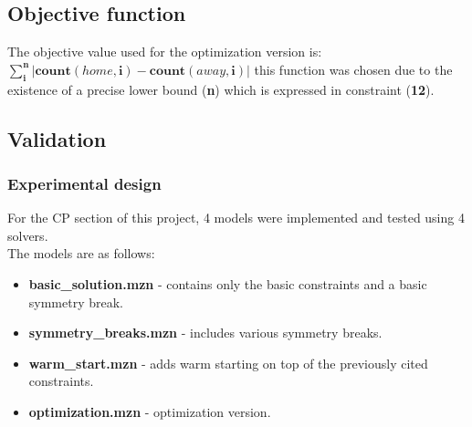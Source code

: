 \documentclass{article}
\begin{document}
\subsection{Objective function}
The objective value used for the optimization version is:\\
$\sum_{\textbf{i}}^{\textbf{n}}|\textbf{count}(home,\textbf{i})-\textbf{count}(away,\textbf{i})|$
this function was chosen due to the existence of a precise lower bound (\textbf{n}) which is expressed in constraint (\textbf{12}).

\subsection{Validation}

\subsubsection{Experimental design}
For the CP section of this project, 4 models were implemented and tested using 4 solvers.\\
The models are as follows:
\begin{itemize}
    \item \textbf{basic\_solution.mzn} - contains only the basic constraints and a basic symmetry break.
    \item \textbf{symmetry\_breaks.mzn} - includes various symmetry breaks.
    \item \textbf{warm\_start.mzn} - adds warm starting on top of the previously cited constraints.
    \item \textbf{optimization.mzn} - optimization version.
\end{itemize}
\end{document}
